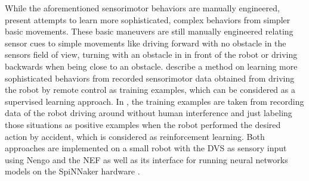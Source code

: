 While the aforementioned sensorimotor behaviors are manually engineered, \textcite{Conradt2014, Stewart2016} present attempts to learn more sophisticated, complex behaviors from simpler basic movements.
These basic maneuvers are still manually engineered relating sensor cues to simple movements like driving forward with no obstacle in the sensors field of view, turning with an obstacle in in front of the robot or driving backwards when being close to an obstacle.
\textcite{Conradt2014} describe a method on learning more sophisticated behaviors from recorded sensorimotor data obtained from driving the robot by remote control as training examples, which can be considered as a supervised learning approach.
In \textcite{Stewart2016}, the training examples are taken from recording data of the robot driving around without human interference and just labeling those situations as positive examples when the robot performed the desired action by accident, which is considered as reinforcement learning.
Both approaches are implemented on a small robot with the \ac{DVS} as sensory input using \ac{Nengo} and the \ac{NEF} as well as its interface \parencite{Mundy2015} for running neural networks models on the \ac{SpiNNaker} hardware \parencite{Furber2014}.
